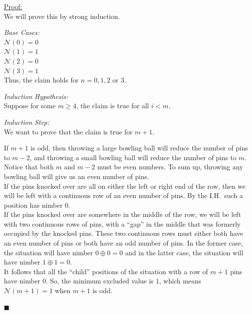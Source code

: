 \documentclass{article}
\newcommand{\I}[1]{\textit{#1}}
\newcommand{\nim}{\mathcal{N}}
\newcommand{\xor}{\oplus}
\newenvironment{claimproof}[1]{\par\noindent\underline{Proof:}\space#1}
{\hfill $\blacksquare$}
\begin{document}
\begin{claimproof}\mbox{}\\
  We will prove this by strong induction.
  \medskip

  \I{Base Cases:} \\
  $\nim(0) = 0$ \\
  $\nim(1) = 1$ \\
  $\nim(2) = 0$ \\
  $\nim(3) = 1$ \\
  Thus, the claim holds for $n = 0, 1, 2$ or $3$.
  \medskip

  \I{Induction Hypothesis:} \\
  Suppose for some $m \geq 4$, the claim is true for all $i < m$.
  \medskip

  \I{Induction Step:} \\
  We want to prove that the claim is true for $m + 1$.
  \smallskip

  If $m + 1$ is odd, then throwing a large bowling ball will
  reduce the number of pins to $m - 2$, and throwing a small
  bowling ball will reduce the number of pins to $m$. Notice
  that both $m$ and $m - 2$ must be even numbers. To sum up,
  throwing any bowling ball will give us an even number of
  pins. \\
  If the pins knocked over are all on either the left or right
  end of the row, then we will be left with a continuous row
  of an even number of pins. By the I.H.\ such a position has
  nimber $0$. \\
  If the pins knocked over are somewhere in the middle of the row,
  we will be left with two continuous rows of pins, with a
  ``gap'' in the middle that was formerly occupied by the
  knocked pins. These two continuous rows must either both have
  an even number of pins or both have an odd number of pins.
  In the former case, the situation will have nimber $0 \xor 0 = 0$
  and in the latter case, the situation will have nimber $1 \xor 1 = 0$. \\
  It follows that all the ``child'' positions of the situation with
  a row of $m + 1$ pins have nimber $0$. So, the minimum excluded
  value is $1$, which means $\nim(m + 1) = 1$ when $m + 1$ is odd. 
  \smallskip


\end{claimproof}
\end{document}
